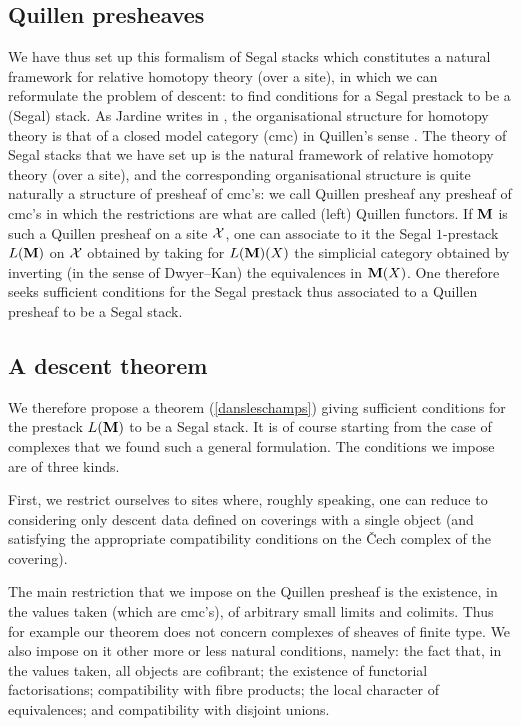 \subsection*{Quillen presheaves}

We have thus set up this formalism of Segal stacks which constitutes a
natural framework for relative homotopy theory (over a site), in which we can
reformulate the problem of descent: to find conditions for a Segal prestack
to be a (Segal) stack. As Jardine writes in \cite{Jardine}, the organisational
structure for homotopy theory is that of a closed model category (cmc) in
Quillen's sense \cite{Quillen}. The theory of Segal stacks that we have set
up is the natural framework of relative homotopy theory (over a site), and
the corresponding organisational structure is quite naturally a structure of
presheaf of cmc's: we call Quillen presheaf any presheaf of cmc's in which
the restrictions are what are called (left) Quillen functors. If ${\bf M}$ is
such a Quillen presheaf on a site ${\cal X}$, one can associate to it the Segal
$1$-prestack $L({\bf M})$ on ${\cal X}$ obtained by taking for $L({\bf M})(X)$ the
simplicial category obtained by inverting (in the sense of Dwyer--Kan) the
equivalences in ${\bf M}(X)$. One therefore seeks sufficient conditions for
the Segal prestack thus associated to a Quillen presheaf to be a Segal stack.

\subsection*{A descent theorem}

We therefore propose a theorem (\ref {dansleschamps}) giving sufficient
conditions for the prestack $L({\bf M})$ to be a Segal stack. It is of course
starting from the case of complexes that we found such a general formulation.
The conditions we impose are of three kinds.

First, we restrict ourselves to sites where, roughly speaking, one can reduce
to considering only descent data defined on coverings with a single object
(and satisfying the appropriate compatibility conditions on the \v{C}ech
complex of the covering).

The main restriction that we impose on the Quillen presheaf is the existence,
in the values taken (which are cmc's), of arbitrary small limits and
colimits. Thus for example our theorem does not concern complexes of sheaves
of finite type. We also impose on it other more or less natural conditions,
namely: the fact that, in the values taken, all objects are cofibrant; the
existence of functorial factorisations; compatibility with fibre products;
the local character of equivalences; and compatibility with disjoint unions.

